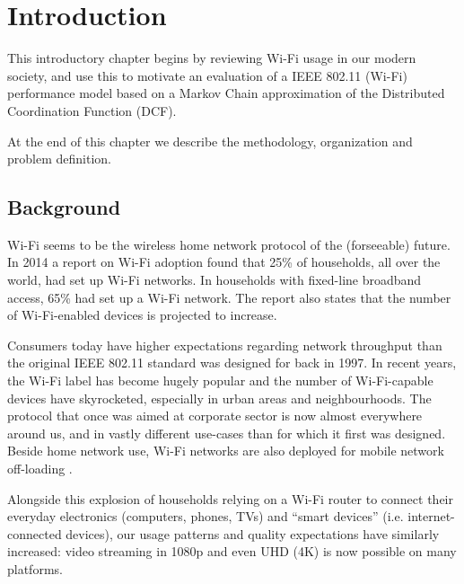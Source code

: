 
\chapter{Introduction}

This introductory chapter begins by reviewing Wi-Fi usage in our modern society, and use this to motivate an evaluation of a IEEE 802.11 (Wi-Fi) performance model based on a Markov Chain approximation of the Distributed Coordination Function (DCF). 

At the end of this chapter we describe the methodology, organization and problem definition.

\section{Background}


Wi-Fi seems to be the wireless home network protocol of the (forseeable)
future. In 2014 a report on Wi-Fi adoption found that 25\% of households, all
over the world, had set up Wi-Fi networks. In households with fixed-line
broadband access, 65\% had set up a Wi-Fi network\cite{smith}. The report also
states that the number of Wi-Fi-enabled devices is projected to increase.

Consumers today have higher expectations regarding network throughput than the
original IEEE 802.11 standard was designed for back in 1997. In recent years,
the Wi-Fi label has become hugely popular and the number of Wi-Fi-capable
devices have skyrocketed, especially in urban areas and neighbourhoods. The
protocol that once was aimed at corporate sector is now almost everywhere
around us, and in vastly different use-cases than for which it first was designed.
Beside home network use, Wi-Fi networks are also deployed for mobile network
off-loading \cite{offloading}.

Alongside this explosion of households relying on a Wi-Fi router to connect
their everyday electronics (computers, phones, TVs) and ``smart devices''
(i.e. internet-connected devices), our usage patterns and quality expectations
have similarly increased: video streaming in 1080p and even UHD (4K) is now
possible on many platforms.

